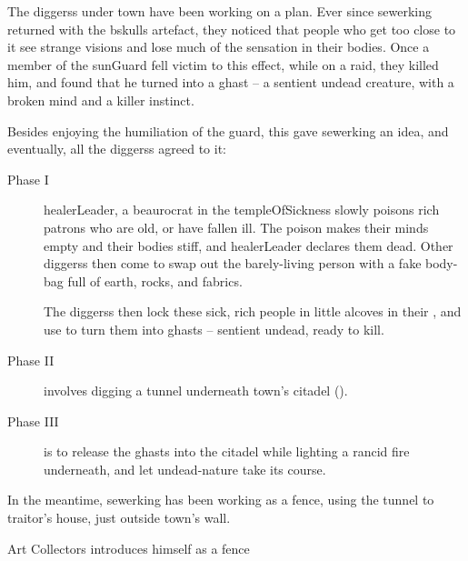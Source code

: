 \label{sewerking}

\begin{exampletext}
  \noindent
  The \glspl{diggers} under \gls{town} have been working on a plan.
  Ever since \gls{sewerking} returned with the \gls{bskulls} \gls{artefact}, they noticed that people who get too close to it see strange visions and lose much of the sensation in their bodies.
  Once a member of the \gls{sunGuard} fell victim to this effect, while on a raid, they killed him, and found that he turned into a ghast -- a sentient undead creature, with a broken mind and a killer instinct.%

  Besides enjoying the humiliation of the guard, this gave \gls{sewerking} an idea, and eventually, all the \glspl{diggers} agreed to it:

\end{exampletext}

  \label{ghastPlan}
  \begin{description}
    \item[Phase I]
    \gls{healerLeader}, a beaurocrat in the \gls{templeOfSickness} slowly poisons rich patrons who are old, or have fallen ill.
    The poison makes their minds empty and their bodies stiff, and \gls{healerLeader} declares them dead.
    Other \glspl{diggers} then come to swap out the barely-living person with a fake body-bag full of earth, rocks, and fabrics.

    The \glspl{diggers} then lock these sick, rich people in little alcoves in their , and use  to turn them into ghasts -- sentient undead, ready to kill.
    \item[Phase II]
    involves digging a tunnel underneath \gls{town}'s citadel ().
    \item[Phase III]
    is to release the ghasts into the citadel while lighting a rancid fire underneath, and let undead-nature take its course.
  \end{description}
  \null

  In the meantime, \gls{sewerking} has been working as a fence, using the tunnel to \gls{traitor}'s house, just outside \gls{town}'s wall.

{Art Collectors}%
{ introduces himself as a fence}%

